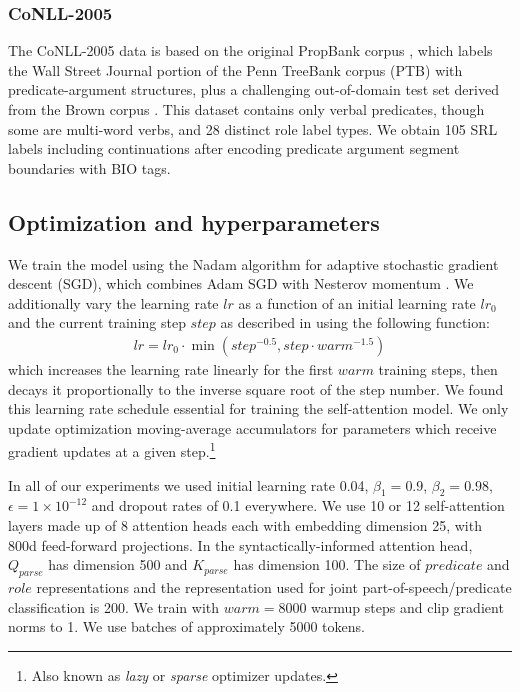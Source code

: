 \documentclass[11pt,a4paper]{article}
\begin{document}
\subsubsection{CoNLL-2005}
The CoNLL-2005 data \citep{carreras2005introduction} is based on the original PropBank corpus \citep{palmer2005proposition}, which labels the Wall Street Journal portion of the Penn TreeBank corpus (PTB) \citep{marcus1993building} with predicate-argument structures, plus a challenging out-of-domain test set derived from the Brown corpus \citep{francis1964manual}. This dataset contains only verbal predicates, though some are multi-word verbs, and 28 distinct role label types. We obtain 105 SRL labels including continuations after encoding predicate argument segment boundaries with BIO tags.

\subsection{Optimization and hyperparameters}
We train the model using the Nadam \citep{dozat2016incorporating} algorithm for adaptive stochastic gradient descent (SGD), which combines Adam \citep{kingma2014adam} SGD with Nesterov momentum \citep{nesterov1983method}. We additionally vary the learning rate $lr$ as a function of an initial learning rate $lr_0$ and the current training step $step$ as described in \citet{vaswani2017attention} using the following function:
\begin{align}
lr = lr_0 \cdot \min(step^{-0.5},  step\cdot warm^{-1.5})
\end{align}
which increases the learning rate linearly for the first $warm$ training steps, then decays it proportionally to the inverse square root of the step number. We found this learning rate schedule essential for training the self-attention model. We only update optimization moving-average accumulators for parameters which receive gradient updates at a given step.\footnote{Also known as \emph{lazy} or \emph{sparse} optimizer updates.}

In all of our experiments we used initial learning rate 0.04, $\beta_1=0.9$, $\beta_2=0.98$, $\epsilon=1\times10^{-12}$ and dropout rates of 0.1 everywhere. We use 10 or 12 self-attention layers made up of 8 attention heads each with embedding dimension 25, with 800d feed-forward projections. In the syntactically-informed attention head, $Q_{parse}$ has dimension 500 and $K_{parse}$ has dimension 100. The size of $predicate$ and $role$ representations and the representation used for joint part-of-speech/predicate classification is 200. We train with $warm=8000$ warmup steps and clip gradient norms to 1. We use batches of approximately 5000 tokens.
\end{document}
